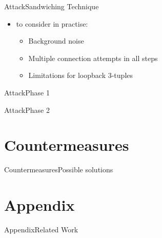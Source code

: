 \documentclass[aspectratio=169, hyperref={colorlinks=true, allcolors=SecondaryColor}, c]{beamer}
\begin{document}
\begin{frame}[fragile]{Attack}{Sandwiching Technique}
  \begin{itemize}
    \item to consider in practise:
      \begin{itemize}
        \item \alert{Background noise}
        \item \alert{Multiple connection attempts in all steps}
        \item \alert{Limitations for loopback 3-tuples}
      \end{itemize}
  \end{itemize}
\end{frame}

\ifattackphaseone
	\begin{frame}[fragile]{Attack}{Phase 1}
		\begin{center}
			\begin{adjustbox}{scale=0.7}
				
			\end{adjustbox}
		\end{center}
	\end{frame}
\else
\fi

\ifattackphaseone
	\begin{frame}[fragile]{Attack}{Phase 2}
		\begin{center}
			\begin{adjustbox}{scale=0.7}
				
			\end{adjustbox}
		\end{center}
	\end{frame}
\else
\fi

\ifcountermeasures
	\section{Countermeasures}

	\begin{frame}[fragile]{Countermeasures}{Possible solutions}
	\end{frame}
\else
\fi

\ifappendix
	\section{Appendix}

	\begin{frame}[fragile]{Appendix}{Related Work}
	\end{frame}
\end{document}
